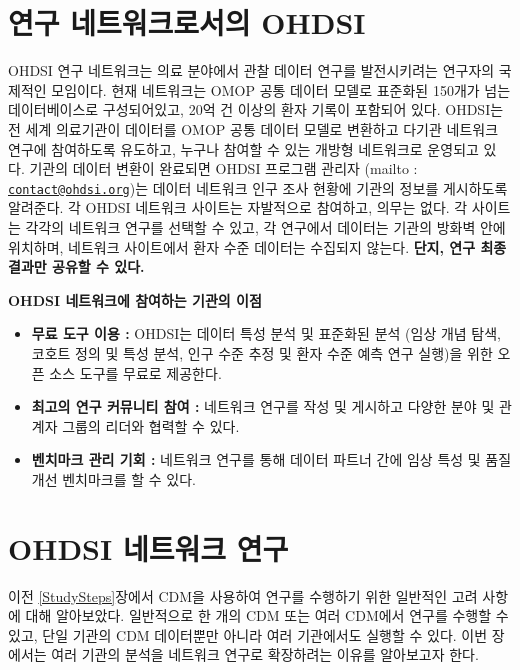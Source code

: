 \documentclass[10.5pt]{book}
\providecommand{\tightlist}{%
  \setlength{\itemsep}{0pt}\setlength{\parskip}{0pt}}
\theoremstyle{definition}
\theoremstyle{definition}
\theoremstyle{definition}
\theoremstyle{remark}
\let\BeginKnitrBlock\begin \let\EndKnitrBlock\end
\begin{document}
\section{연구 네트워크로서의 OHDSI}\label{--ohdsi}


OHDSI 연구 네트워크는 의료 분야에서 관찰 데이터 연구를 발전시키려는
연구자의 국제적인 모임이다. 현재 네트워크는 OMOP 공통 데이터 모델로
표준화된 150개가 넘는 데이터베이스로 구성되어있고, 20억 건 이상의 환자
기록이 포함되어 있다. OHDSI는 전 세계 의료기관이 데이터를 OMOP 공통
데이터 모델로 변환하고 다기관 네트워크 연구에 참여하도록 유도하고,
누구나 참여할 수 있는 개방형 네트워크로 운영되고 있다. 기관의 데이터
변환이 완료되면 OHDSI 프로그램 관리자 (mailto :
\href{mailto:contact@ohdsi.org}{\nolinkurl{contact@ohdsi.org}})는 데이터
네트워크 인구 조사 현황에 기관의 정보를 게시하도록 알려준다. 각 OHDSI
네트워크 사이트는 자발적으로 참여하고, 의무는 없다. 각 사이트는 각각의
네트워크 연구를 선택할 수 있고, 각 연구에서 데이터는 기관의 방화벽 안에
위치하며, 네트워크 사이트에서 환자 수준 데이터는 수집되지 않는다.
\textbf{단지, 연구 최종 결과만 공유할 수 있다.}

\BeginKnitrBlock{rmdimportant}
\textbf{OHDSI 네트워크에 참여하는 기관의 이점}

\begin{itemize}
\tightlist
\item
  \textbf{무료 도구 이용 :} OHDSI는 데이터 특성 분석 및 표준화된 분석
  (임상 개념 탐색, 코호트 정의 및 특성 분석, 인구 수준 추정 및 환자 수준
  예측 연구 실행)을 위한 오픈 소스 도구를 무료로 제공한다.
\item
  \textbf{최고의 연구 커뮤니티 참여 :} 네트워크 연구를 작성 및 게시하고
  다양한 분야 및 관계자 그룹의 리더와 협력할 수 있다.
\item
  \textbf{벤치마크 관리 기회 :} 네트워크 연구를 통해 데이터 파트너 간에
  임상 특성 및 품질 개선 벤치마크를 할 수 있다.
\end{itemize}
\EndKnitrBlock{rmdimportant}

\section{OHDSI 네트워크 연구}\label{ohdsi--}


이전 \ref{StudySteps}장에서 CDM을 사용하여 연구를 수행하기 위한 일반적인
고려 사항에 대해 알아보았다. 일반적으로 한 개의 CDM 또는 여러 CDM에서
연구를 수행할 수 있고, 단일 기관의 CDM 데이터뿐만 아니라 여러 기관에서도
실행할 수 있다. 이번 장에서는 여러 기관의 분석을 네트워크 연구로
확장하려는 이유를 알아보고자 한다.
\end{document}
